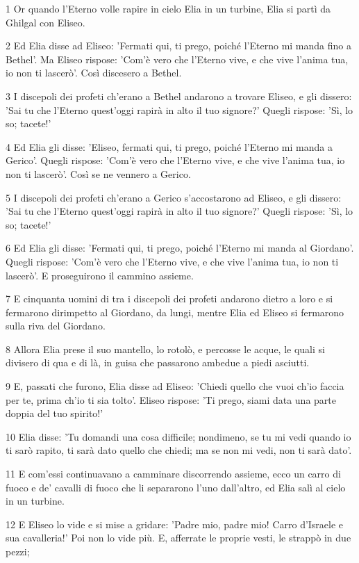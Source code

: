 \par 1 Or quando l'Eterno volle rapire in cielo Elia in un turbine, Elia si partì da Ghilgal con Eliseo.
\par 2 Ed Elia disse ad Eliseo: 'Fermati qui, ti prego, poiché l'Eterno mi manda fino a Bethel'. Ma Eliseo rispose: 'Com'è vero che l'Eterno vive, e che vive l'anima tua, io non ti lascerò'. Così discesero a Bethel.
\par 3 I discepoli dei profeti ch'erano a Bethel andarono a trovare Eliseo, e gli dissero: 'Sai tu che l'Eterno quest'oggi rapirà in alto il tuo signore?' Quegli rispose: 'Sì, lo so; tacete!'
\par 4 Ed Elia gli disse: 'Eliseo, fermati qui, ti prego, poiché l'Eterno mi manda a Gerico'. Quegli rispose: 'Com'è vero che l'Eterno vive, e che vive l'anima tua, io non ti lascerò'. Così se ne vennero a Gerico.
\par 5 I discepoli dei profeti ch'erano a Gerico s'accostarono ad Eliseo, e gli dissero: 'Sai tu che l'Eterno quest'oggi rapirà in alto il tuo signore?' Quegli rispose: 'Sì, lo so; tacete!'
\par 6 Ed Elia gli disse: 'Fermati qui, ti prego, poiché l'Eterno mi manda al Giordano'. Quegli rispose: 'Com'è vero che l'Eterno vive, e che vive l'anima tua, io non ti lascerò'. E proseguirono il cammino assieme.
\par 7 E cinquanta uomini di tra i discepoli dei profeti andarono dietro a loro e si fermarono dirimpetto al Giordano, da lungi, mentre Elia ed Eliseo si fermarono sulla riva del Giordano.
\par 8 Allora Elia prese il suo mantello, lo rotolò, e percosse le acque, le quali si divisero di qua e di là, in guisa che passarono ambedue a piedi asciutti.
\par 9 E, passati che furono, Elia disse ad Eliseo: 'Chiedi quello che vuoi ch'io faccia per te, prima ch'io ti sia tolto'. Eliseo rispose: 'Ti prego, siami data una parte doppia del tuo spirito!'
\par 10 Elia disse: 'Tu domandi una cosa difficile; nondimeno, se tu mi vedi quando io ti sarò rapito, ti sarà dato quello che chiedi; ma se non mi vedi, non ti sarà dato'.
\par 11 E com'essi continuavano a camminare discorrendo assieme, ecco un carro di fuoco e de' cavalli di fuoco che li separarono l'uno dall'altro, ed Elia salì al cielo in un turbine.
\par 12 E Eliseo lo vide e si mise a gridare: 'Padre mio, padre mio! Carro d'Israele e sua cavalleria!' Poi non lo vide più. E, afferrate le proprie vesti, le strappò in due pezzi;
